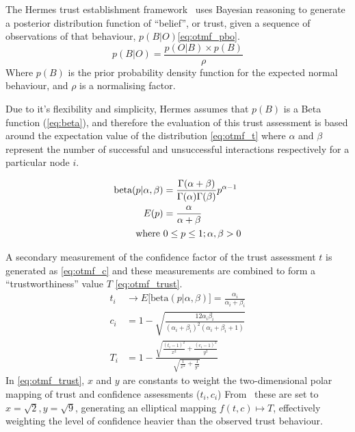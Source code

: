 The Hermes trust establishment framework~\cite{Zouridaki2005} uses Bayesian reasoning to generate a posterior distribution function of ``belief'', or trust, given a sequence of observations of that behaviour, $p(B|O)$\eqref{eq:otmf_pbo}.
%
\begin{equation}
  p(B|O)  = \frac{p(O|B) \times p(B)}{\rho}
  \label{eq:otmf_pbo}
\end{equation}
%
Where $p(B)$ is the prior probability density function for the expected normal behaviour, and $\rho$ is a normalising factor.

Due to it's flexibility and simplicity, Hermes assumes that $p(B)$ is a Beta function (\eqref{eq:beta}), and therefore the evaluation of this trust assessment is based around the expectation value of the distribution \eqref{eq:otmf_t}  where $\alpha$ and $\beta$ represent the number of successful and unsuccessful interactions respectively for a particular node $i$.

\begin{align}
  \label{eq:beta}
  \text{beta}(p|\alpha,\beta) &= \frac{\Gamma(\alpha + \beta)}{\Gamma(\alpha)\Gamma(\beta)}p^{\alpha-1}\\
  \label{eq:beta_e}
  E(p) &= \frac{\alpha}{\alpha + \beta}\\
  \text{where } &0 \leq p \leq 1; \alpha,\beta > 0 \notag
\end{align}
%

A secondary measurement of the confidence factor of the trust assessment $t$ is generated as \eqref{eq:otmf_c} and these measurements are combined to form a ``trustworthiness'' value $T$ \eqref{eq:otmf_trust}.
%
\begin{align}
  t_i &\to E\lbrack\text{beta}(p|\alpha,\beta)\rbrack = \frac{\alpha_i}{\alpha_i+\beta_i} \label{eq:otmf_t}\\[5pt]
  c_i &= 1 - \sqrt{\frac{12\alpha_i\beta_i}{(\alpha_i+\beta_i)^2(\alpha_i+\beta_i+1)}} \label{eq:otmf_c}\\[5pt]
  T_i &= 1 - \frac{\sqrt{\frac{(t_i-1)^2}{x^2} + \frac{(c_i-1)^2}{y^2}}}{\sqrt{\frac{1}{x^2}+\frac{1}{y^2}}} \label{eq:otmf_trust}
\end{align}
%
In \eqref{eq:otmf_trust}, $x$ and $y$ are constants to weight the two-dimensional polar mapping of trust and confidence assessments ($t_i,c_i$)
From~\citet{Zouridaki2005} these are set to $x=\sqrt{2},y=\sqrt{9}$, generating an elliptical mapping $f(t,c) \mapsto T$, effectively weighting the level of confidence heavier than the observed trust behaviour.

